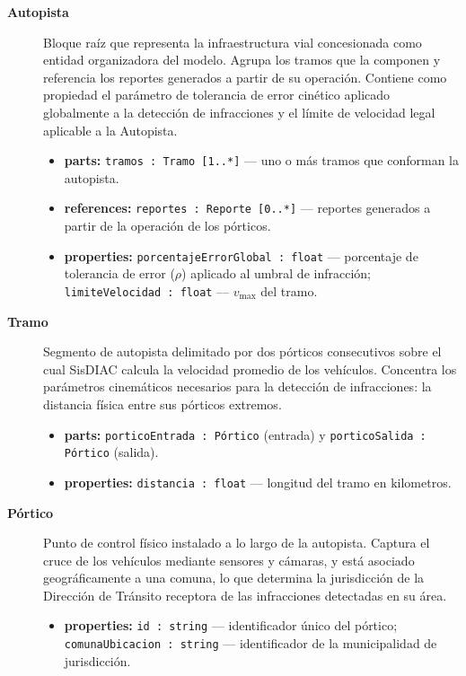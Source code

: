 \documentclass[12pt,letterpaper]{article}
\begin{document}
{\sloppy
	\begin{description}

		\item[\textbf{Autopista}]
		      Bloque raíz que representa la infraestructura vial concesionada como entidad organizadora del modelo. Agrupa los tramos que la componen y referencia los reportes generados a partir de su operación. Contiene como propiedad el parámetro de tolerancia de error cinético aplicado globalmente a la detección de infracciones y el límite de velocidad legal aplicable a la Autopista.
		      \begin{itemize}
			      \item \textbf{parts:} \texttt{tramos : Tramo [1..*]} — uno o más tramos que conforman la autopista.
			      \item \textbf{references:} \texttt{reportes : Reporte [0..*]} — reportes generados a partir de la operación de los pórticos.
			      \item \textbf{properties:} \texttt{porcentajeErrorGlobal : float} — porcentaje de tolerancia de error ($\rho$) aplicado al umbral de infracción; \texttt{limiteVelocidad : float} — $v_{\text{max}}$ del tramo.
		      \end{itemize}

		\item[\textbf{Tramo}]
		      Segmento de autopista delimitado por dos pórticos consecutivos sobre el cual SisDIAC calcula la velocidad promedio de los vehículos. Concentra los parámetros cinemáticos necesarios para la detección de infracciones: la distancia física entre sus pórticos extremos.
		      \begin{itemize}
			      \item \textbf{parts:} \texttt{porticoEntrada : Pórtico} (entrada) y \texttt{porticoSalida : Pórtico} (salida).
			      \item \textbf{properties:} \texttt{distancia : float} — longitud del tramo en kilometros.
		      \end{itemize}

		\item[\textbf{Pórtico}]
		      Punto de control físico instalado a lo largo de la autopista. Captura el cruce de los vehículos mediante sensores y cámaras, y está asociado geográficamente a una comuna, lo que determina la jurisdicción de la Dirección de Tránsito receptora de las infracciones detectadas en su área.
		      \begin{itemize}
			      \item \textbf{properties:} \texttt{id : string} — identificador único del pórtico; \texttt{comunaUbicacion : string} — identificador de la municipalidad de jurisdicción.
		      \end{itemize}


\end{description}}
\end{document}
